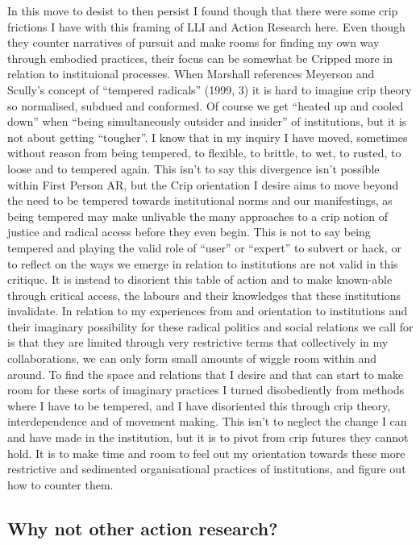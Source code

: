 In this move to desist to then persist I found though that there were
some crip frictions I have with this framing of LLI and Action Research
here. Even though they counter narratives of pursuit and make rooms for
finding my own way through embodied practices, their focus can be
somewhat be Cripped more in relation to instituional processes. When
Marshall references Meyerson and Scully's concept of ``tempered
radicals'' (1999, 3) it is hard to imagine crip theory so normalised,
subdued and conformed. Of course we get ``heated up and cooled down''
when ``being simultaneously outsider and insider'' of institutions, but
it is not about getting ``tougher''. I know that in my inquiry I have
moved, sometimes without reason from being tempered, to flexible, to
brittle, to wet, to rusted, to loose and to tempered again. This isn't
to say this divergence isn't possible within First Person AR, but the
Crip orientation I desire aims to move beyond the need to be tempered
towards institutional norms and our manifestings, as being tempered may
make unlivable the many approaches to a crip notion of justice and
radical access before they even begin. This is not to say being tempered
and playing the valid role of ``user'' or ``expert'' to subvert or hack,
or to reflect on the ways we emerge in relation to institutions are not
valid in this critique. It is instead to disorient this table of action
and to make known-able through critical access, the labours and their
knowledges that these institutions invalidate. In relation to my
experiences from and orientation to institutions and their imaginary
possibility for these radical politics and social relations we call for
is that they are limited through very restrictive terms that
collectively in my collaborations, we can only form small amounts of
wiggle room within and around. To find the space and relations that I
desire and that can start to make room for these sorts of imaginary
practices I turned disobediently from methods where I have to be
tempered, and I have disoriented this through crip theory,
interdependence and of movement making. This isn't to neglect the change
I can and have made in the institution, but it is to pivot from crip
futures they cannot hold. It is to make time and room to feel out my
orientation towards these more restrictive and sedimented organisational
practices of institutions, and figure out how to counter them.

\hypertarget{why-not-other-action-research}{%
\subsection[Why not other action
research?]{\texorpdfstring{\protect\hypertarget{anchor}{}{}Why not other
action
research?}{Why not other action research?}}\label{why-not-other-action-research}}

